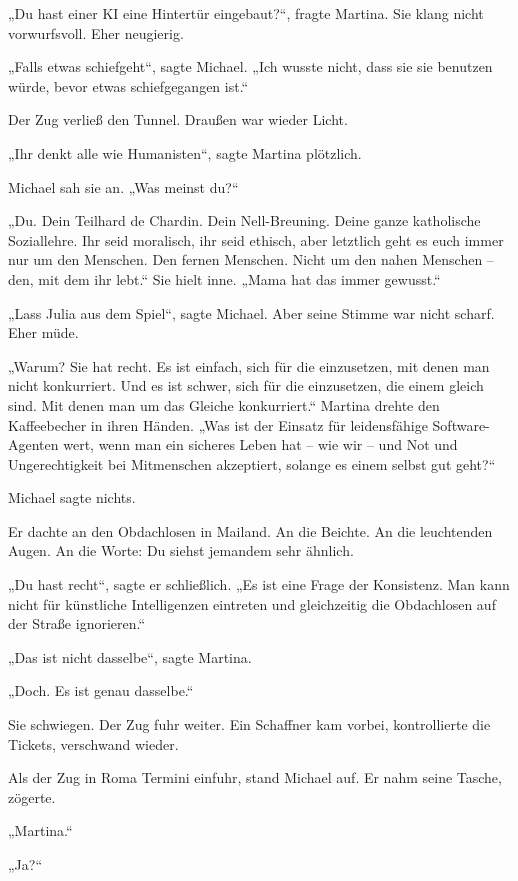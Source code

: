\documentclass[
]{article}
\begin{document}
„Du hast einer KI eine Hintertür eingebaut?{\kern0pt}``, fragte Martina. Sie klang nicht vorwurfsvoll. Eher neugierig.

„Falls etwas schiefgeht``, sagte Michael. „Ich wusste nicht, dass sie sie benutzen würde, bevor etwas schiefgegangen ist.``

Der Zug verließ den Tunnel. Draußen war wieder Licht.

„Ihr denkt alle wie Humanisten``, sagte Martina plötzlich.

Michael sah sie an. „Was meinst du?{\kern0pt}``

„Du. Dein Teilhard de Chardin. Dein Nell-Breuning. Deine ganze katholische Soziallehre. Ihr seid moralisch, ihr seid ethisch, aber letztlich geht es euch immer nur um den Menschen. Den fernen Menschen. Nicht um den nahen Menschen -- den, mit dem ihr lebt.`` Sie hielt inne. „Mama hat das immer gewusst.``

„Lass Julia aus dem Spiel``, sagte Michael. Aber seine Stimme war nicht scharf. Eher müde.

„Warum? Sie hat recht. Es ist einfach, sich für die einzusetzen, mit denen man nicht konkurriert. Und es ist schwer, sich für die einzusetzen, die einem gleich sind. Mit denen man um das Gleiche konkurriert.`` Martina drehte den Kaffeebecher in ihren Händen. „Was ist der Einsatz für leidensfähige Software-Agenten wert, wenn man ein sicheres Leben hat -- wie wir -- und Not und Ungerechtigkeit bei Mitmenschen akzeptiert, solange es einem selbst gut geht?{\kern0pt}``

Michael sagte nichts.

Er dachte an den Obdachlosen in Mailand. An die Beichte. An die leuchtenden Augen. An die Worte: Du siehst jemandem sehr ähnlich.

„Du hast recht``, sagte er schließlich. „Es ist eine Frage der Konsistenz. Man kann nicht für künstliche Intelligenzen eintreten und gleichzeitig die Obdachlosen auf der Straße ignorieren.``

„Das ist nicht dasselbe``, sagte Martina.

„Doch. Es ist genau dasselbe.``

Sie schwiegen. Der Zug fuhr weiter. Ein Schaffner kam vorbei, kontrollierte die Tickets, verschwand wieder.

Als der Zug in Roma Termini einfuhr, stand Michael auf. Er nahm seine Tasche, zögerte.

„Martina.``

„Ja?{\kern0pt}``
\end{document}
